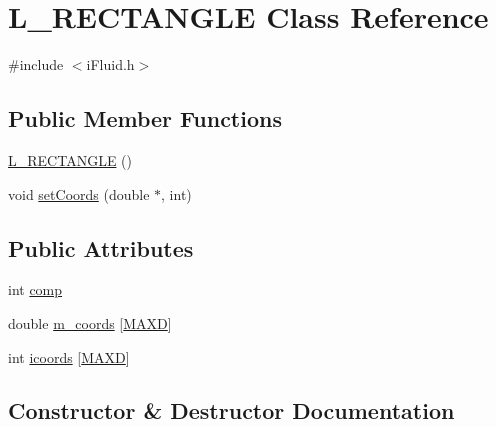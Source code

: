 \hypertarget{class_l___r_e_c_t_a_n_g_l_e}{}\section{L\+\_\+\+R\+E\+C\+T\+A\+N\+G\+LE Class Reference}
\label{class_l___r_e_c_t_a_n_g_l_e}


{\ttfamily \#include $<$i\+Fluid.\+h$>$}

\subsection*{Public Member Functions}
\begin{DoxyCompactItemize}
\item 
\hyperlink{class_l___r_e_c_t_a_n_g_l_e_a06094787b1cff31aa717fb1da0435886}{L\+\_\+\+R\+E\+C\+T\+A\+N\+G\+LE} ()
\item 
void \hyperlink{class_l___r_e_c_t_a_n_g_l_e_a651f0395972cb76895afdf70e96ce5ba}{set\+Coords} (double $\ast$, int)
\end{DoxyCompactItemize}
\subsection*{Public Attributes}
\begin{DoxyCompactItemize}
\item 
int \hyperlink{class_l___r_e_c_t_a_n_g_l_e_ac08f88f13428a67d6152099fb1b3c0f4}{comp}
\item 
double \hyperlink{class_l___r_e_c_t_a_n_g_l_e_a1e1f2d9759fb7ba7b6476e699b7ff876}{m\+\_\+coords} \mbox{[}\hyperlink{geom_8h_aabfcbcb5ac86a1edac4035264bc7d2b8ac79558c6c6666a44ddf7e701241b8211}{M\+A\+XD}\mbox{]}
\item 
int \hyperlink{class_l___r_e_c_t_a_n_g_l_e_a9a8133311c4cc3db39d60f6fd37f8eb8}{icoords} \mbox{[}\hyperlink{geom_8h_aabfcbcb5ac86a1edac4035264bc7d2b8ac79558c6c6666a44ddf7e701241b8211}{M\+A\+XD}\mbox{]}
\end{DoxyCompactItemize}


\subsection{Constructor \& Destructor Documentation}
